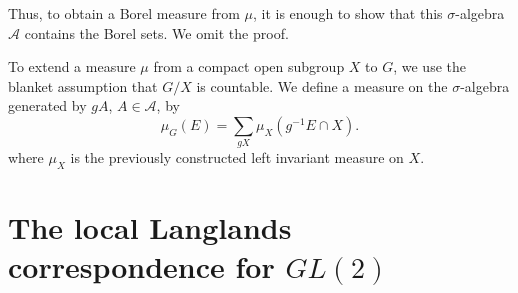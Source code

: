 \documentclass{amsart}
\begin{document}
Thus, to obtain a Borel measure from $\mu$,
it is enough to show that this $\sigma$-algebra ${\mathcal A}$ contains the
Borel sets.  We omit the proof.

To extend a measure $\mu$ from a compact open subgroup $X$ to $G$, we
use the blanket assumption that $G/X$ is countable.  We define a
measure on the $\sigma$-algebra generated by $g A$, $A\in {\mathcal
  A}$, by
\[
\mu_G(E ) = \sum_{g X} \mu_X(g^{-1} E \cap X).
\]
where $\mu_X$ is the previously constructed left invariant measure on
$X$.












\section{The local Langlands correspondence for $GL(2)$}



\raggedright




\end{document}
